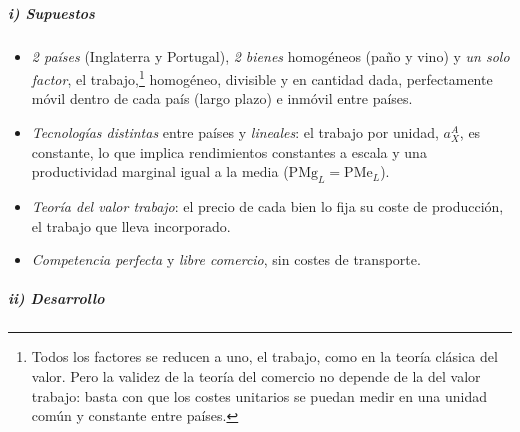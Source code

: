 \documentclass[11pt]{article}
\begin{document}
\subparagraph{i) Supuestos}

\begin{itemize}
\item \emph{2 países} (Inglaterra y Portugal), \emph{2 bienes} homogéneos (paño y vino) y \emph{un solo factor}, el trabajo,\footnote{Todos los factores se reducen a uno, el trabajo, como en la teoría clásica del valor. Pero la validez de la teoría del comercio no depende de la del valor trabajo: basta con que los costes unitarios se puedan medir en una unidad común y constante entre países.} homogéneo, divisible y en cantidad dada, perfectamente móvil dentro de cada país (largo plazo) e inmóvil entre países.
\item \emph{Tecnologías distintas} entre países y \emph{lineales}: el trabajo por unidad, $a_X^A$, es constante, lo que implica rendimientos constantes a escala y una productividad marginal igual a la media ($\mathrm{PMg}_L=\mathrm{PMe}_L$).
\item \emph{Teoría del valor trabajo}: el precio de cada bien lo fija su coste de producción, el trabajo que lleva incorporado.
\item \emph{Competencia perfecta} y \emph{libre comercio}, sin costes de transporte.
\end{itemize}

\subparagraph{ii) Desarrollo}
\end{document}
